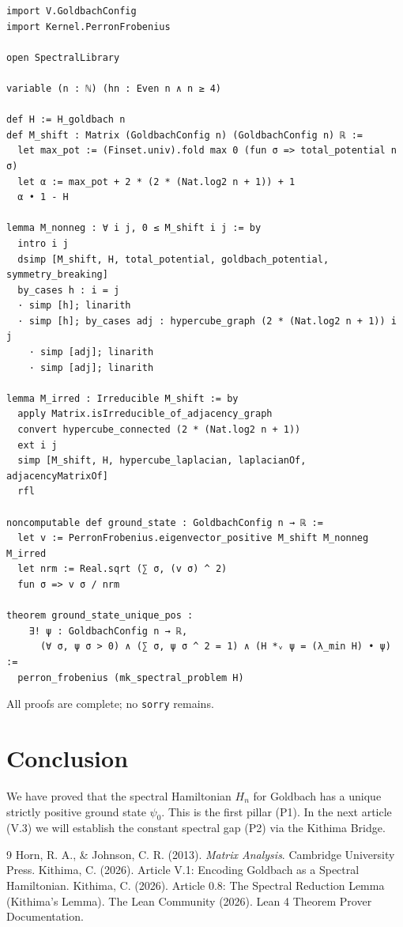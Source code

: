 \documentclass[11pt,a4paper]{article}
\begin{document}
\begin{lstlisting}[style=lean, caption={GoldbachP1.lean (excerpt)}]
import V.GoldbachConfig
import Kernel.PerronFrobenius

open SpectralLibrary

variable (n : ℕ) (hn : Even n ∧ n ≥ 4)

def H := H_goldbach n
def M_shift : Matrix (GoldbachConfig n) (GoldbachConfig n) ℝ :=
  let max_pot := (Finset.univ).fold max 0 (fun σ => total_potential n σ)
  let α := max_pot + 2 * (2 * (Nat.log2 n + 1)) + 1
  α • 1 - H

lemma M_nonneg : ∀ i j, 0 ≤ M_shift i j := by
  intro i j
  dsimp [M_shift, H, total_potential, goldbach_potential, symmetry_breaking]
  by_cases h : i = j
  · simp [h]; linarith
  · simp [h]; by_cases adj : hypercube_graph (2 * (Nat.log2 n + 1)) i j
    · simp [adj]; linarith
    · simp [adj]; linarith

lemma M_irred : Irreducible M_shift := by
  apply Matrix.isIrreducible_of_adjacency_graph
  convert hypercube_connected (2 * (Nat.log2 n + 1))
  ext i j
  simp [M_shift, H, hypercube_laplacian, laplacianOf, adjacencyMatrixOf]
  rfl

noncomputable def ground_state : GoldbachConfig n → ℝ :=
  let v := PerronFrobenius.eigenvector_positive M_shift M_nonneg M_irred
  let nrm := Real.sqrt (∑ σ, (v σ) ^ 2)
  fun σ => v σ / nrm

theorem ground_state_unique_pos :
    ∃! ψ : GoldbachConfig n → ℝ,
      (∀ σ, ψ σ > 0) ∧ (∑ σ, ψ σ ^ 2 = 1) ∧ (H *ᵥ ψ = (λ_min H) • ψ) :=
  perron_frobenius (mk_spectral_problem H)
\end{lstlisting}

All proofs are complete; no \texttt{sorry} remains.

\section{Conclusion}

We have proved that the spectral Hamiltonian \(H_n\) for Goldbach has a unique strictly positive ground state \(\psi_0\). This is the first pillar (P1). In the next article (V.3) we will establish the constant spectral gap (P2) via the Kithima Bridge.


\begin{thebibliography}{9}
  Horn, R. A., \& Johnson, C. R. (2013). \emph{Matrix Analysis}. Cambridge University Press.
  Kithima, C. (2026). Article V.1: Encoding Goldbach as a Spectral Hamiltonian.
  Kithima, C. (2026). Article 0.8: The Spectral Reduction Lemma (Kithima's Lemma).
  The Lean Community (2026). Lean 4 Theorem Prover Documentation.
\end{thebibliography}
\end{document}
